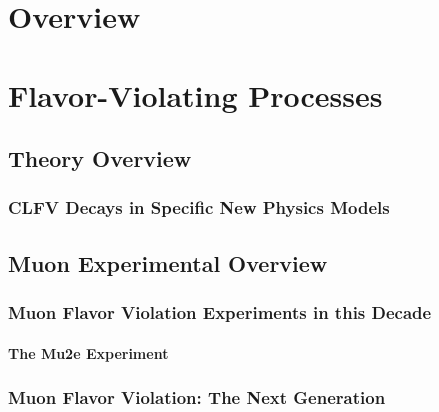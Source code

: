\chapter{Overview}\label{sec:cl:over}
\medskip


\chapter{Flavor-Violating Processes}%
%


\section{Theory Overview}\label{sec:cl:fvt}
\vskip -12pt


\subsection{CLFV Decays in Specific New Physics Models}
\vskip -12pt




\section{Muon Experimental Overview}\label{sec:cl:muexp}

\subsection{Muon Flavor Violation Experiments in this Decade}
\vskip -12pt
\subsubsection{The Mu2e Experiment}
\vskip -12pt


\subsection{Muon Flavor Violation: The Next Generation}

